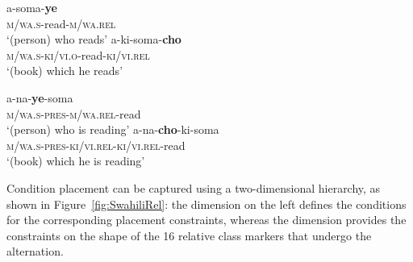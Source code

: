 \begin{exe}
  \ex\label{ex:SwahiliRel:suff}
  \begin{xlist}
    \ex\gll  a-soma-\textbf{ye}\\
    \textsc{m/wa.s}-read\textsc{-m/wa.rel}\\
    ‘(person) who reads’
    \ex\gll a-ki-soma-\textbf{cho}\\
    \textsc{m/wa.s}-\textsc{ki/vi.o}-read-\textsc{ki/vi.rel}\\
    ‘(book) which he reads’
  \end{xlist}
  \ex\label{ex:SwahiliRel:pref}
  \begin{xlist}
    \ex\gll  a-na-\textbf{ye}-soma\\
    \textsc{m/wa.s-pres-m/wa.rel}-read\\
    ‘(person) who is reading’
    \ex\gll a-na-\textbf{cho}-ki-soma\\
    \textsc{m/wa.s-pres-ki/vi.rel-ki/vi.rel}-read\\
    ‘(book) which he is reading’
  \end{xlist}
\end{exe}

Condition placement can be captured using a two-dimensional hierarchy,
as shown in Figure~\ref{fig:SwahiliRel}: the 
dimension on the left defines the conditions for the corresponding
placement constraints, whereas the  dimension
provides the constraints on the shape of the 16 relative class markers
that undergo the alternation.   

